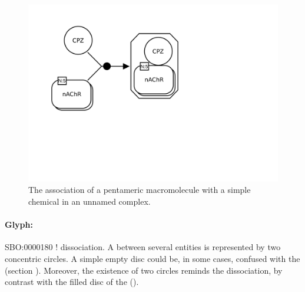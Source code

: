 \begin{figure}[H]
  \centering
  \includegraphics[scale = 0.3]{examples/association-unamed}
  \caption{The association of a pentameric macromolecule with a simple chemical in an unnamed complex.}
  \label{fig:assoc-unamed}
\end{figure}



\paragraph{Glyph: }\label{sec:dissociation}

\begin{glyphDescription}
 \glyphSboTerm SBO:0000180 ! dissociation.
 \glyphNode A  between several entities is represented by two concentric circles. A simple empty disc could be, in some cases, confused with the  (section ). Moreover, the existence of two circles reminds the dissociation, by contrast with the filled disc of the  ().
 \end{glyphDescription}


